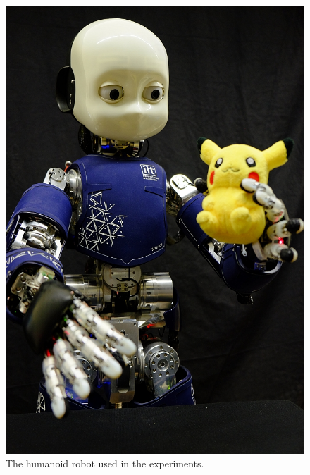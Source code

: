 %
\begin{figure}
	\vspace{-10pt}
	\centering
	\includegraphics[width=.999\linewidth]{robertoIROS/fig/iCubDarmstadt01_new}
	\caption{The humanoid robot \robot{} used in the experiments.}
    \vspace{-10pt}
	\label{fig:icub}
\end{figure}
%

